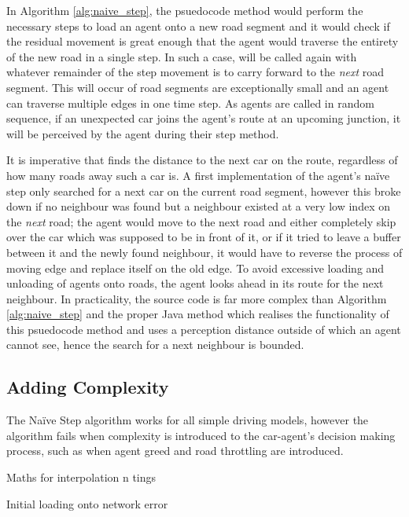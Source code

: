 In Algorithm \ref{alg:naive_step}, the  psuedocode method would perform the necessary steps to load an agent onto a new road segment and it would check if the residual movement is great enough that the agent would traverse the entirety of the new road in a single step. In such a case,  will be called again with whatever remainder of the step movement is to carry forward to the \textit{next} road segment. This will occur of road segments are exceptionally small and an agent can traverse multiple edges in one time step. As agents are called in random sequence, if an unexpected car joins the agent's route at an upcoming junction, it will be perceived by the agent during their step method. 

It is imperative that  finds the distance to the next car on the route, regardless of how many roads away such a car is. A first implementation of the agent's naïve step only searched for a next car on the current road segment, however this broke down if no neighbour was found but a neighbour existed at a very low index on the \textit{next} road; the agent would move to the next road and either completely skip over the car which was supposed to be in front of it, or if it tried to leave a buffer between it and the newly found neighbour, it would have to reverse the process of moving edge and replace itself on the old edge. To avoid excessive loading and unloading of agents onto roads, the agent looks ahead in its route for the next neighbour. In practicality, the source code is far more complex than Algorithm \ref{alg:naive_step} and the proper Java method  which realises the functionality of this psuedocode method and uses a perception distance outside of which an agent cannot see, hence the search for a next neighbour is bounded.


\subsection{Adding Complexity}

The Naïve Step algorithm works for all simple driving models, however the algorithm fails when complexity is introduced to the car-agent's decision making process, such as when agent greed and road throttling are introduced.

Maths for interpolation n tings
    
Initial loading onto network error